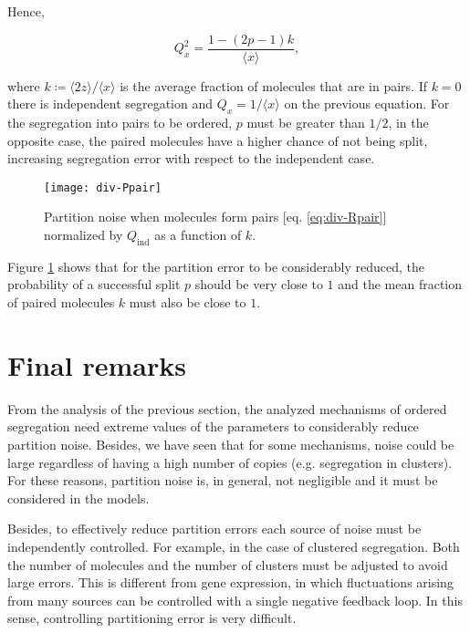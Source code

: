 Hence,

\begin{equation}
  \label{eq:div-Rpair}
  Q_x^2 = \frac{1 - (2p-1)k}{\langle x\rangle},
\end{equation}

where $k\coloneqq\langle 2z\rangle/\langle x\rangle$ is the average fraction of molecules that are in pairs. If $k=0$ there is independent segregation and $Q_x = 1/\langle x\rangle$ on the previous equation. For the segregation into pairs to be ordered, $p$ must be greater than $1/2$, in the opposite case, the paired molecules have a higher chance of not being split, increasing segregation error with respect to the independent case.

\begin{figure}[H]
  \centering
  \texttt{[image: div-Ppair]}
  \caption[Partition noise when molecules form pairs]{\label{fig:div-Ppair}Partition noise when molecules form pairs [eq. \eqref{eq:div-Rpair}] normalized by $Q_\text{ind}$ as a function of $k$.}
\end{figure}

Figure \ref{fig:div-Ppair} shows that for the partition error to be considerably reduced, the probability of a successful split $p$ should be very close to $1$ and the mean fraction of paired molecules $k$ must also be close to $1$.

\section{Final remarks}

From the analysis of the previous section, the analyzed mechanisms of ordered segregation need extreme values of the parameters to considerably reduce partition noise. Besides, we have seen that for some mechanisms, noise could be large regardless of having a high number of copies (e.g. segregation in clusters). For these reasons, partition noise is, in general, not negligible and it must be considered in the models.

Besides, to effectively reduce partition errors each source of noise must be independently controlled. For example, in the case of clustered segregation. Both the number of molecules and the number of clusters must be adjusted to avoid large errors. This is different from gene expression, in which fluctuations arising from many sources can be controlled with a single negative feedback loop. In this sense, controlling partitioning error is very difficult.


